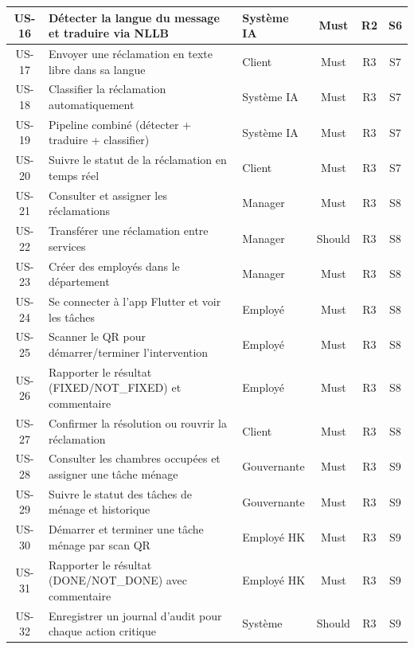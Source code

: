 \begin{longtable}{|c|p{8.5cm}|p{2cm}|c|c|c|}
\hline
US-16 & Détecter la langue du message et traduire via NLLB & Système IA & Must & R2 & S6 \\
\hline
US-17 & Envoyer une réclamation en texte libre dans sa langue & Client & Must & R3 & S7 \\
\hline
US-18 & Classifier la réclamation automatiquement & Système IA & Must & R3 & S7 \\
\hline
US-19 & Pipeline combiné (détecter + traduire + classifier) & Système IA & Must & R3 & S7 \\
\hline
US-20 & Suivre le statut de la réclamation en temps réel & Client & Must & R3 & S7 \\
\hline
US-21 & Consulter et assigner les réclamations & Manager & Must & R3 & S8 \\
\hline
US-22 & Transférer une réclamation entre services & Manager & Should & R3 & S8 \\
\hline
US-23 & Créer des employés dans le département & Manager & Must & R3 & S8 \\
\hline
US-24 & Se connecter à l'app Flutter et voir les tâches & Employé & Must & R3 & S8 \\
\hline
US-25 & Scanner le QR pour démarrer/terminer l'intervention & Employé & Must & R3 & S8 \\
\hline
US-26 & Rapporter le résultat (FIXED/NOT\_FIXED) et commentaire & Employé & Must & R3 & S8 \\
\hline
US-27 & Confirmer la résolution ou rouvrir la réclamation & Client & Must & R3 & S8 \\
\hline
US-28 & Consulter les chambres occupées et assigner une tâche ménage & Gouvernante & Must & R3 & S9 \\
\hline
US-29 & Suivre le statut des tâches de ménage et historique & Gouvernante & Must & R3 & S9 \\
\hline
US-30 & Démarrer et terminer une tâche ménage par scan QR & Employé HK & Must & R3 & S9 \\
\hline
US-31 & Rapporter le résultat (DONE/NOT\_DONE) avec commentaire & Employé HK & Must & R3 & S9 \\
\hline
US-32 & Enregistrer un journal d'audit pour chaque action critique & Système & Should & R3 & S9 \\
\hline
\end{longtable}
